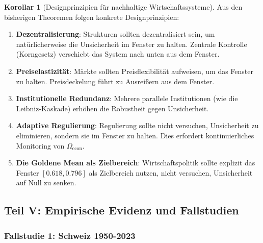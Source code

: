 \documentclass[a4paper,12pt,twoside]{report}
\theoremstyle{definition}
\newtheorem{korollar}{Korollar}
\begin{document}
\begin{korollar}[Designprinzipien für nachhaltige Wirtschaftssysteme]

Aus den bisherigen Theoremen folgen konkrete Designprinzipien:

\begin{enumerate}
	\item \textbf{Dezentralisierung}: Strukturen sollten dezentralisiert sein, um natürlicherweise die Unsicherheit im Fenster zu halten. Zentrale Kontrolle (Korngesetz) verschiebt das System nach unten aus dem Fenster.
	
	\item \textbf{Preiselastizität}: Märkte sollten Preisflexibilität aufweisen, um das Fenster zu halten. Preisdeckelung führt zu Ausreißern aus dem Fenster.
	
	\item \textbf{Institutionelle Redundanz}: Mehrere parallele Institutionen (wie die Leibniz-Kaskade) erhöhen die Robustheit gegen Unsicherheit.
	
	\item \textbf{Adaptive Regulierung}: Regulierung sollte nicht versuchen, Unsicherheit zu eliminieren, sondern sie im Fenster zu halten. Dies erfordert kontinuierliches Monitoring von $\Omega_{\text{econ}}$.
	
	\item \textbf{Die Goldene Mean als Zielbereich}: Wirtschaftspolitik sollte explizit das Fenster $[0.618, 0.796]$ als Zielbereich nutzen, nicht versuchen, Unsicherheit auf Null zu senken.
\end{enumerate}

\end{korollar}

\subsection{Teil V: Empirische Evidenz und Fallstudien}

\subsubsection{Fallstudie 1: Schweiz 1950-2023}
\end{document}
